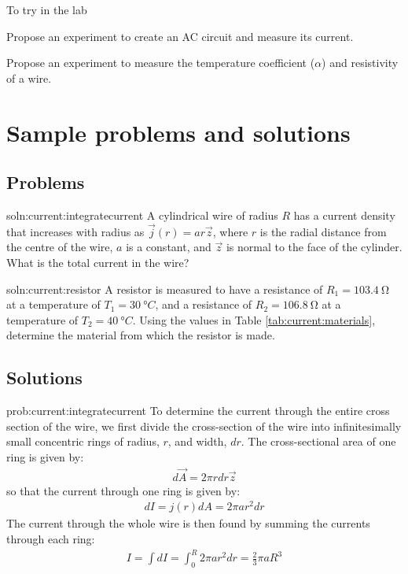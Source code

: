\begin{chapteractivity}{To try in the lab}
{
\item Propose an experiment to create an AC circuit and measure its current.
\item Propose an experiment to measure the temperature coefficient ($\alpha$) and resistivity of a wire.
}
\end{chapteractivity}

\newpage
\section{Sample problems and solutions}



\subsection{Problems}
\begin{problem}{soln:current:integratecurrent}{\label{prob:current:integratecurrent}}
A cylindrical wire of radius $R$ has a current density that increases with radius as $\vec j(r) = ar \vec z$, where $r$ is the radial distance from the centre of the wire, $a$ is a constant, and $\vec z$ is normal to the face of the cylinder. What is the total current in the wire?
\end{problem}


\begin{problem}{soln:current:resistor}{\label{prob:current:resistor} A resistor is measured to have a resistance of $R_1=\SI{103.4}{\ohm}$ at a temperature of $T_1=\SI{30}{\degree C}$, and a resistance of $R_2=\SI{106.8}{\ohm}$ at a temperature of $T_2=\SI{40}{\degree C}$. Using the values in Table \ref{tab:current:materials}, determine the material from which the resistor is made.
}
\end{problem}


\newpage
\subsection{Solutions}
\begin{solution}{prob:current:integratecurrent}\label{soln:current:integratecurrent}
To determine the current through the entire cross section of the wire, we first divide the cross-section of the wire into infinitesimally small concentric rings of radius, $r$, and width, $dr$. The cross-sectional area of one ring is given by:
\begin{align*}
d\vec A = 2\pi r dr \vec z
\end{align*}
so that the current through one ring is given by:
\begin{align*}
dI = j(r) dA = 2\pi a r^2 dr
\end{align*}
The current through the whole wire is then found by summing the currents through each ring:
\begin{align*}
I=\int dI = \int_0^R 2\pi a r^2 dr=\frac{2}{3}\pi aR^3
\end{align*}
\end{solution}

